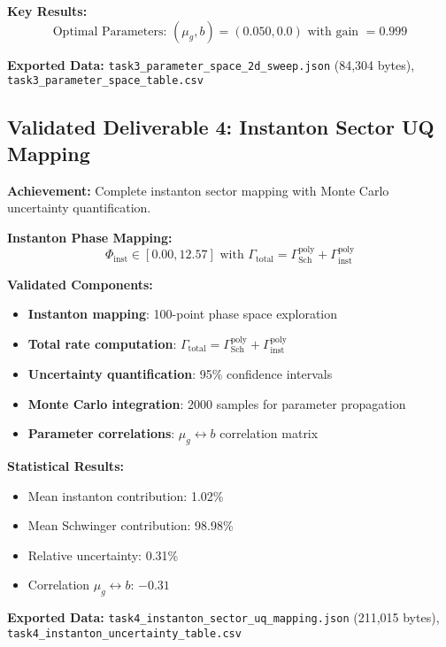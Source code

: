 \documentclass[11pt]{article}
\begin{document}
\textbf{Key Results:}
\begin{equation}
\boxed{\text{Optimal Parameters: } (\mu_g, b) = (0.050, 0.0) \text{ with gain } = 0.999}
\end{equation}

\textbf{Exported Data:} \texttt{task3\_parameter\_space\_2d\_sweep.json} (84,304 bytes), \texttt{task3\_parameter\_space\_table.csv}

\subsection{Validated Deliverable 4: Instanton Sector UQ Mapping}

\textbf{Achievement:} Complete instanton sector mapping with Monte Carlo uncertainty quantification.

\textbf{Instanton Phase Mapping:}
\begin{equation}
\Phi_{\text{inst}} \in [0.00, 12.57] \text{ with } \Gamma_{\text{total}} = \Gamma_{\text{Sch}}^{\text{poly}} + \Gamma_{\text{inst}}^{\text{poly}}
\end{equation}

\textbf{Validated Components:}
\begin{itemize}
    \item \textbf{Instanton mapping}: 100-point phase space exploration
    \item \textbf{Total rate computation}: $\Gamma_{\text{total}} = \Gamma_{\text{Sch}}^{\text{poly}} + \Gamma_{\text{inst}}^{\text{poly}}$
    \item \textbf{Uncertainty quantification}: 95\% confidence intervals
    \item \textbf{Monte Carlo integration}: 2000 samples for parameter propagation
    \item \textbf{Parameter correlations}: $\mu_g \leftrightarrow b$ correlation matrix
\end{itemize}

\textbf{Statistical Results:}
\begin{itemize}
    \item Mean instanton contribution: 1.02\%
    \item Mean Schwinger contribution: 98.98\%
    \item Relative uncertainty: 0.31\%
    \item Correlation $\mu_g \leftrightarrow b$: $-0.31$
\end{itemize}

\textbf{Exported Data:} \texttt{task4\_instanton\_sector\_uq\_mapping.json} (211,015 bytes), \texttt{task4\_instanton\_uncertainty\_table.csv}
\end{document}
